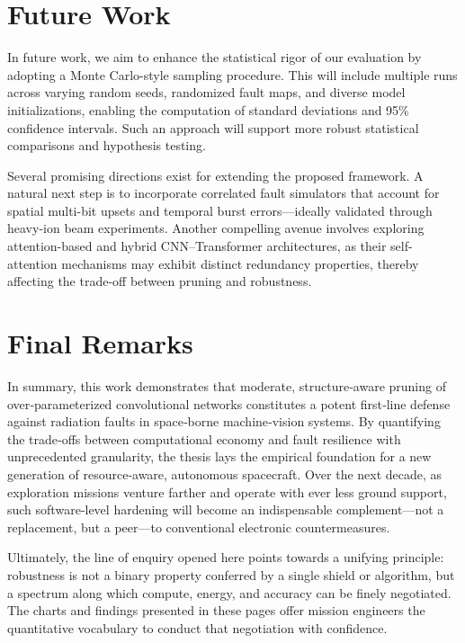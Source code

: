 \section{Future Work}
In future work, we aim to enhance the statistical rigor of our evaluation by adopting a Monte Carlo-style sampling procedure. This will include multiple runs across varying random seeds, randomized fault maps, and diverse model initializations, enabling the computation of standard deviations and 95\% confidence intervals. Such an approach will support more robust statistical comparisons and hypothesis testing.

Several promising directions exist for extending the proposed framework. A natural next step is to incorporate correlated fault simulators that account for spatial multi-bit upsets and temporal burst errors—ideally validated through heavy-ion beam experiments. Another compelling avenue involves exploring attention-based and hybrid CNN–Transformer architectures, as their self-attention mechanisms may exhibit distinct redundancy properties, thereby affecting the trade-off between pruning and robustness.









\section{Final Remarks}
In summary, this work demonstrates that moderate, structure‑aware pruning of over‑parameterized convolutional networks constitutes a potent first‑line defense against radiation faults in space‑borne machine‑vision systems. By quantifying the trade‑offs between computational economy and fault resilience with unprecedented granularity, the thesis lays the empirical foundation for a new generation of resource‑aware, autonomous spacecraft. Over the next decade, as exploration missions venture farther and operate with ever less ground support, such software‑level hardening will become an indispensable complement—not a replacement, but a peer—to conventional electronic countermeasures.\par
Ultimately, the line of enquiry opened here points towards a unifying principle: robustness is not a binary property conferred by a single shield or algorithm, but a spectrum along which compute, energy, and accuracy can be finely negotiated. The charts and findings presented in these pages offer mission engineers the quantitative vocabulary to conduct that negotiation with confidence.